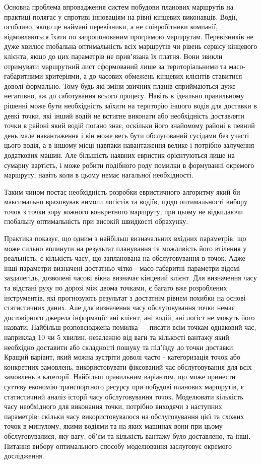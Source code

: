 Основна проблема впровадження систем побудови планових маршрутів на практиці полягає у спротиві інноваціям на рівні кінцевих виконавців. Водії, особливо, якщо це наймані перевізники, а не співробітники компанії, відмовляються їхати по запропонованим програмою маршрутам. Перевізників не дуже хвилює глобальна оптимальність всіх маршрутів чи рівень сервісу кінцевого клієнта, якщо до цих параметрів не привʼязана їх платня. Вони звикли отримувати маршрутний лист сформований лише за територіальними та масо-габаритними критеріями, а до часових обмежень кінцевих клієнтів ставитися доволі формально. Тому будь-які зміни звичних планів сприймаються дуже негативно, аж до саботування всього процесу. Навіть в ідеально правильному рішенні може бути необхідність заїхати на територію іншого водія для доставки в деякі точки, які інший водій не встигне виконати або необхідність доставляти точки в районі який водій погано знає, оскільки його знайомому районі в певний день мале навантаження і він може весь бути обслугований сусідами без участі цього водія, а в іншому місці навпаки навантаження велике і потрібно залучення додаткових машин. Але більшість наявних евристик орієнтуються лише на сумарну вартість, і може робити подібного роду помилки в формуванні окремого маршруту, навіть коли в цьому немає нагальної необхідності.

Таким чином постає необхідність розробки евристичного алгоритму який би максимально враховував вимоги логістів та водіїв, щодо оптимальності вибору точок з точки зору кожного конкретного маршруту, при цьому не відкидаючи глобальну оптимальність при високій швидкості обрахунку.

Практика показує, що одним з найбільш визначальних вхідних параметрів, що може сильно вплинути на результат планування та можливість його втілення у  реальність, є кількість часу, що запланована на обслуговування в точок. Адже інші параметри визначені достатньо чітко - масо-габаритні параметри відомі заздалегідь, дозволені часові вікна визначає кінцевий клієнт. Для визначення часу та відстані руху по дорозі між двома точками, є багато вже розроблених інструментів, які прогнозують результат з достатнім рівнем похибки на основі статистичних даних. Але для визначення часу обслуговування точки немає достовірного джерела інформації: ані клієнт, ані водій, ані логіст не можуть його назвати. Найбільш розповсюджена помилка --- писати всім точкам однаковий час, наприклад 10 чи 5  хвилин, незалежно від ваги та кількості вантажу який необхідно доставити або складності пошуку та підʼїзду до точки доставки. Кращий варіант, який можна зустріти доволі часто - категоризація точок або конкретних замовлень, використовувати фіксований час обслуговування для всіх замовлень в категорії. Найбільш правильним варіантом, що може принести суттєву економію транспортного ресурсу при побудові планових маршрутів, є статистичний аналіз історії часу обслуговування точок. Моделювати кількість часу необхідного для виконання точки, потрібно виходячи з наступних параметрів: скільки часу використовувалося на обслуговування цієї та схожих точок в минулому, якими водіями та на яких машинах вони при цьому обслуговувалися, яку вагу, обʼєм та кількість вантажу було доставлено, та інші. Питання вибору оптимального способу моделювання заслуговує окремого дослідження.

